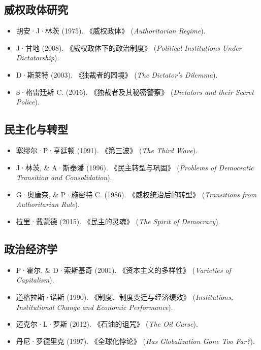 \documentclass[a5paper, 11pt, openany]{ctexbook}
\begin{document}
\subsection*{威权政体研究}
\begin{itemize}
    \item 胡安·J·林茨 (1975). 《威权政体》 (\textit{Authoritarian Regime}).
    \item J·甘地 (2008). 《威权政体下的政治制度》 (\textit{Political Institutions Under Dictatorship}).
    \item D·斯莱特 (2003). 《独裁者的困境》 (\textit{The Dictator's Dilemma}).
    \item S·格雷廷斯 C. (2016). 《独裁者及其秘密警察》 (\textit{Dictators and their Secret Police}).
\end{itemize}

\subsection*{民主化与转型}
\begin{itemize}
    \item 塞缪尔·P·亨廷顿 (1991). 《第三波》 (\textit{The Third Wave}).
    \item J·林茨, \& A·斯泰潘 (1996). 《民主转型与巩固》 (\textit{Problems of Democratic Transition and Consolidation}).
    \item G·奥唐奈, \& P·施密特 C. (1986). 《威权统治后的转型》 (\textit{Transitions from Authoritarian Rule}).
    \item 拉里·戴蒙德 (2015). 《民主的灵魂》 (\textit{The Spirit of Democracy}).
\end{itemize}

\subsection*{政治经济学}
\begin{itemize}
    \item P·霍尔, \& D·索斯基奇 (2001). 《资本主义的多样性》 (\textit{Varieties of Capitalism}).
    \item 道格拉斯·诺斯 (1990). 《制度、制度变迁与经济绩效》 (\textit{Institutions, Institutional Change and Economic Performance}).
    \item 迈克尔·L·罗斯 (2012). 《石油的诅咒》 (\textit{The Oil Curse}).
    \item 丹尼·罗德里克 (1997). 《全球化悖论》 (\textit{Has Globalization Gone Too Far?}).
\end{itemize}
\end{document}
